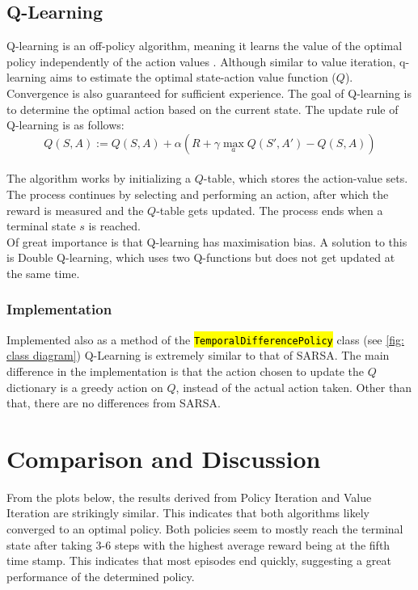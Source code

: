 \documentclass{class}
\def\code#1{\hl{\texttt{#1}}}
\begin{document}
\subsection{Q-Learning}
\label{subsec: q-learning}
Q-learning is an off-policy algorithm, meaning it learns the value of the optimal policy independently of the action values \parencite[p. 475]{poole-2017}. Although similar to value iteration, q-learning aims to estimate the optimal state-action value function ($Q$). Convergence is also guaranteed for sufficient experience. The goal of Q-learning is to determine the optimal action based on the current state. The update rule of Q-learning is as follows:
\begin{equation}
    \label{eq: q_learning}
    Q(S,A) := Q(S,A) + \alpha(R + \gamma \max_a Q(S', A') - Q(S, A))
\end{equation}
\\[0.3cm]
The algorithm works by initializing a $Q$-table, which stores the action-value sets. The process continues by selecting and performing an action, after which the reward is measured and the $Q$-table gets updated. The process ends when a terminal state $s$ is reached.
\\[0.3cm]
Of great importance is that Q-learning has maximisation bias. A solution to this is Double Q-learning, which uses two Q-functions but does not get updated at the same time.

\subsubsection*{Implementation}
Implemented also as a method of the \code{TemporalDifferencePolicy} class (see \autoref{fig: class diagram}) Q-Learning is extremely similar to that of SARSA. The main difference in the implementation is that the action chosen to update the $Q$ dictionary is a greedy action on $Q$, instead of the actual action taken. Other than that, there are no differences from SARSA.

\section{Comparison and Discussion}
\label{sec: comparison and discussion}
From the plots below, the results derived from Policy Iteration and Value Iteration are strikingly similar. This indicates that both algorithms likely converged to an optimal policy. Both policies seem to mostly reach the terminal state after taking 3-6 steps with the highest average reward being at the fifth time stamp. This indicates that most episodes end quickly, suggesting a great performance of the determined policy.
\end{document}
